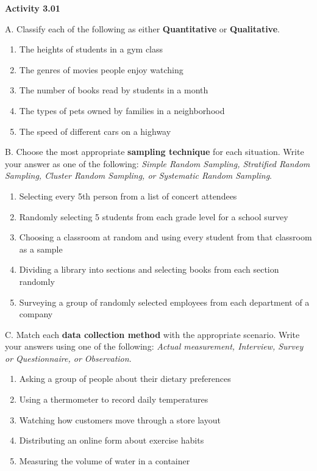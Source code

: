 \vspace{0.3ex}
\noindent\textbf{Activity 3.01}

\vspace{0.2ex}

\noindent A. Classify each of the following as either \textbf{Quantitative} or \textbf{Qualitative}.
\begin{enumerate}[label=\color{blue}\arabic*. , noitemsep]
    \item The heights of students in a gym class
    \item The genres of movies people enjoy watching
    \item The number of books read by students in a month
    \item The types of pets owned by families in a neighborhood
    \item The speed of different cars on a highway
\end{enumerate}

\noindent B. Choose the most appropriate \textbf{sampling technique} for each situation. Write your answer as one of the following: \textit{Simple Random Sampling, Stratified Random Sampling, Cluster Random Sampling, or Systematic Random Sampling}.
\begin{enumerate}[label=\color{blue}\arabic*. , noitemsep]
    \item Selecting every 5th person from a list of concert attendees
    \item Randomly selecting 5 students from each grade level for a school survey
    \item Choosing a classroom at random and using every student from that classroom as a sample
    \item Dividing a library into sections and selecting books from each section randomly
    \item Surveying a group of randomly selected employees from each department of a company
\end{enumerate}

\noindent C. Match each \textbf{data collection method} with the appropriate scenario. Write your answers using one of the following: \textit{Actual measurement, Interview, Survey or Questionnaire, or Observation}.
\begin{enumerate}[label=\color{blue}\arabic*. , noitemsep]
    \item Asking a group of people about their dietary preferences
    \item Using a thermometer to record daily temperatures
    \item Watching how customers move through a store layout
    \item Distributing an online form about exercise habits
    \item Measuring the volume of water in a container
\end{enumerate}
